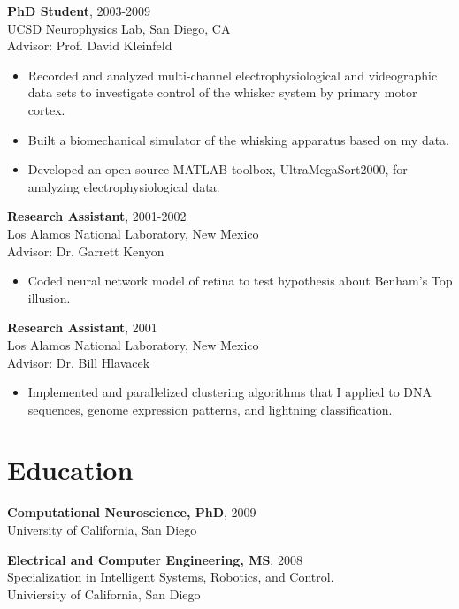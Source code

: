 \documentclass[line,11pt]{res}
\begin{document}
\begin{resume}
{\bf PhD Student}, 2003-2009 \\ UCSD Neurophysics Lab, San Diego, CA \\ Advisor: Prof. David Kleinfeld
  \begin{itemize}
        \item[] Recorded and analyzed multi-channel electrophysiological and videographic data sets to investigate control of the whisker system by primary motor cortex.
        \item[] Built a biomechanical simulator of the whisking apparatus based on my data.
        \item[] Developed an open-source MATLAB toolbox, UltraMegaSort2000, for analyzing electrophysiological data. 
  \end{itemize}

   {\bf Research Assistant}, 2001-2002 \\ Los Alamos National Laboratory, New Mexico  
   \\ Advisor: Dr. Garrett Kenyon
  \begin{itemize}
        \item[] Coded neural network model of retina to test hypothesis about Benham's Top illusion.
  \end{itemize}

   {\bf Research Assistant}, 2001 \\ Los Alamos National Laboratory, New Mexico  
   \\ Advisor: Dr. Bill Hlavacek
  \begin{itemize}
  \item[] Implemented and parallelized clustering algorithms that I applied to DNA sequences, genome expression patterns, and lightning classification. 
  \end{itemize}

\section{Education}
\vspace{0.1in} 
 
 	\textbf{Computational Neuroscience, PhD}, 2009 \\
    University of California, San Diego
 
 	\textbf{Electrical and Computer Engineering, MS}, 2008 \\    
    Specialization in Intelligent Systems, Robotics, and Control.\\
    Univiersity of California, San Diego
    

\end{resume}
\end{document}
